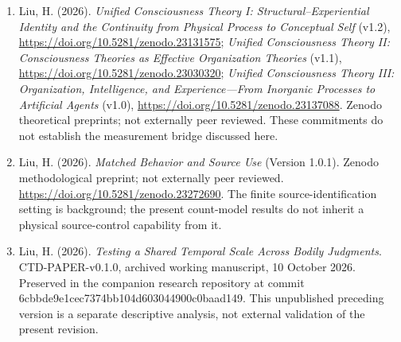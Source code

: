 \documentclass[
  11pt,
]{article}
\begin{document}
\begin{enumerate}
\item
  Liu, H. (2026). \emph{Unified Consciousness Theory I:
  Structural--Experiential Identity and the Continuity from Physical
  Process to Conceptual Self} (v1.2),
  \url{https://doi.org/10.5281/zenodo.23131575}; \emph{Unified
  Consciousness Theory II: Consciousness Theories as Effective
  Organization Theories} (v1.1),
  \url{https://doi.org/10.5281/zenodo.23030320}; \emph{Unified
  Consciousness Theory III: Organization, Intelligence, and
  Experience---From Inorganic Processes to Artificial Agents} (v1.0),
  \url{https://doi.org/10.5281/zenodo.23137088}. Zenodo theoretical
  preprints; not externally peer reviewed. These commitments do not
  establish the measurement bridge discussed here.
\item
  Liu, H. (2026). \emph{Matched Behavior and Source Use} (Version
  1.0.1). Zenodo methodological preprint; not externally peer reviewed.
  \url{https://doi.org/10.5281/zenodo.23272690}. The finite
  source-identification setting is background; the present count-model
  results do not inherit a physical source-control capability from it.
\item
  Liu, H. (2026). \emph{Testing a Shared Temporal Scale Across Bodily
  Judgments}. CTD-PAPER-v0.1.0, archived working manuscript, 10 October
  2026. Preserved in the companion research repository at commit
  6cbbde9e1cec7374bb104d603044900c0baad149. This unpublished preceding
  version is a separate descriptive analysis, not external validation of
  the present revision.
\end{enumerate}
\end{document}
